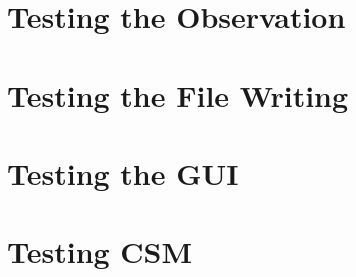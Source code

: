 			
		\section{Testing the Observation}
			
			
			
		\section{Testing the File Writing}
			
		\section{Testing the GUI}
			
		\section{Testing CSM}
			
